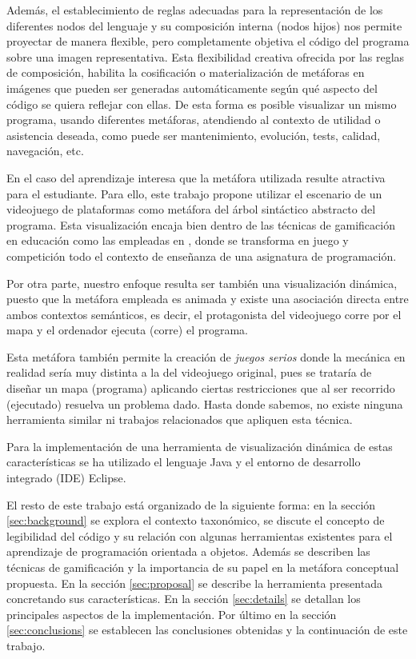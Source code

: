 \documentclass{llncs}
\begin{document}
Además, el establecimiento de reglas adecuadas para la representación de los diferentes nodos del lenguaje y su composición interna (nodos hijos) nos permite proyectar de manera flexible, pero completamente objetiva el código del programa sobre una imagen representativa. Esta flexibilidad creativa ofrecida por las reglas de composición, habilita la cosificación o materialización de metáforas \cite{travers1996programming} en imágenes que pueden ser generadas automáticamente según qué aspecto del código se quiera reflejar con ellas. De esta forma es posible visualizar un mismo programa, usando diferentes metáforas, atendiendo al contexto de utilidad o asistencia deseada, como puede ser mantenimiento, evolución, tests, calidad, navegación, etc.

En el caso del aprendizaje interesa que la metáfora utilizada resulte atractiva para el estudiante. Para ello, este trabajo propone utilizar el escenario de un videojuego de plataformas como metáfora del árbol sintáctico abstracto del programa. Esta visualización encaja bien dentro de las técnicas de gamificación en educación como las empleadas en \cite{kumar2012gamification}, donde se transforma en juego y competición todo el contexto de enseñanza de una asignatura de programación. 

Por otra parte, nuestro enfoque resulta ser también una visualización dinámica, puesto que la metáfora empleada es animada y existe una asociación directa entre ambos contextos semánticos, es decir, el protagonista del videojuego corre por el mapa y el ordenador ejecuta (corre) el programa. 

Esta metáfora también permite la creación de \emph{juegos serios} donde la mecánica en realidad sería muy distinta a la del videojuego original, pues se trataría de diseñar un mapa (programa) aplicando ciertas restricciones que al ser recorrido (ejecutado) resuelva un problema dado. Hasta donde sabemos, no existe ninguna herramienta similar ni trabajos relacionados que apliquen esta técnica.

Para la implementación de una herramienta de visualización dinámica de estas características se ha utilizado el lenguaje Java y el entorno de desarrollo integrado (IDE) Eclipse. 

El resto de este trabajo está organizado de la siguiente forma: en la sección \ref{sec:background} se explora el contexto taxonómico, se discute el concepto de legibilidad del código y su relación con algunas herramientas existentes para el aprendizaje de programación orientada a objetos. Además se describen las técnicas de gamificación y la importancia de su papel en la metáfora conceptual propuesta. En la sección \ref{sec:proposal} se describe la herramienta presentada concretando sus características. En la sección \ref{sec:details} se detallan los principales aspectos de la implementación. Por último en la sección \ref{sec:conclusions} se establecen las conclusiones obtenidas y la continuación de este trabajo. 
\end{document}
